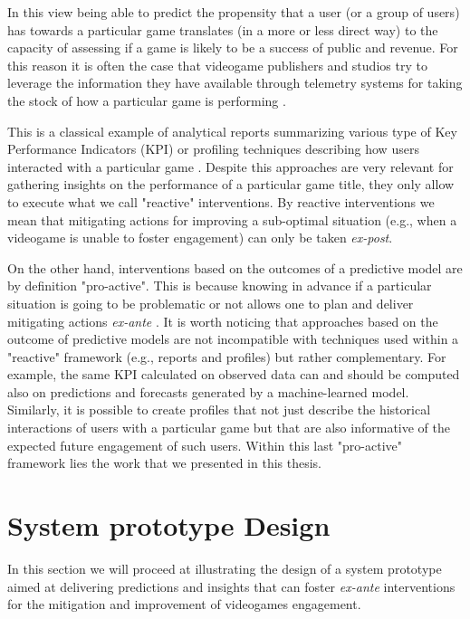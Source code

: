In this view being able to predict the propensity that a user (or a group of users) has towards a particular game translates (in a more or less direct way) to the capacity of assessing if a game is likely to be a success of public and revenue. For this reason it is often the case that videogame publishers and studios try to leverage the information they have available through telemetry systems for taking the stock of how a particular game is performing \cite{el2016game}. 

This is a classical example of analytical reports summarizing various type of Key Performance Indicators (KPI)\cite{el2016game} or profiling techniques describing how users interacted with a particular game \cite{el2016game}. Despite this approaches are very relevant for gathering insights on the performance of a particular game title, they only allow to execute what we call "reactive" interventions. By reactive interventions we mean that mitigating actions for improving a sub-optimal situation (e.g., when a videogame is unable to foster engagement) can only be taken \textit{ex-post}.

On the other hand, interventions based on the outcomes of a predictive model are by definition "pro-active". This is because knowing in advance if a particular situation is going to be problematic or not allows one to plan and deliver mitigating actions \textit{ex-ante} \cite{el2016game, el2021game}. It is worth noticing that approaches based on the outcome of predictive models are not incompatible with techniques used within a "reactive" framework (e.g., reports and profiles) but rather complementary. For example, the same KPI calculated on observed data can and should be computed also on predictions and forecasts generated by a machine-learned model. Similarly, it is possible to create profiles that not just describe the historical interactions of users with a particular game but that are also informative of the expected future engagement of such users. Within this last "pro-active" framework lies the work that we presented in this thesis. 

\section{System prototype Design}
\label{pipeline}

In this section we will proceed at illustrating the design of a system prototype aimed at delivering predictions and insights that can foster \textit{ex-ante} interventions for the mitigation and improvement of videogames engagement. 

